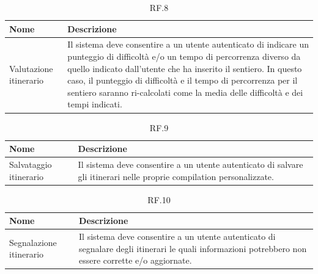 \documentclass{natourDoc}
\begin{document}
\begin{table}[H]
	\centering
	\begin{tabular}{ |p{5cm}|p{10.3cm}| }
		\hline
		\rowcolor{PineGreen!70}
		\textbf{Nome}          & \textbf{Descrizione}                                                                                   \\
		\hline
		Valutazione itinerario & Il sistema deve consentire a un utente autenticato di indicare un punteggio di difficoltà e/o un tempo
		di percorrenza diverso da quello indicato dall’utente che ha inserito il sentiero. In questo caso, il
		punteggio di difficoltà e il tempo di percorrenza per il sentiero saranno ri-calcolati come la media
		delle difficoltà e dei tempi indicati.                                                                                          \\
		\hline
	\end{tabular}
	\caption{RF.8}

\end{table}

\begin{table}[H]
	\centering
	\begin{tabular}{ |p{5cm}|p{10.3cm}| }
		\hline
		\rowcolor{PineGreen!70}
		\textbf{Nome}          & \textbf{Descrizione}                                                        \\
		\hline
		Salvataggio itinerario & Il sistema deve consentire a un utente autenticato di salvare gli itinerari
		nelle proprie compilation personalizzate.                                                            \\
		\hline
	\end{tabular}
	\caption{RF.9}

\end{table}

\begin{table}[H]
	\centering
	\begin{tabular}{ |p{5cm}|p{10.3cm}| }
		\hline
		\rowcolor{PineGreen!70}
		\textbf{Nome}           & \textbf{Descrizione}                                                            \\
		\hline
		Segnalazione itinerario & Il sistema deve consentire a un utente autenticato di segnalare degli itinerari
		le quali informazioni potrebbero non essere corrette e/o aggiornate.                                      \\
		\hline
	\end{tabular}
	\caption{RF.10}

\end{table}
\end{document}

